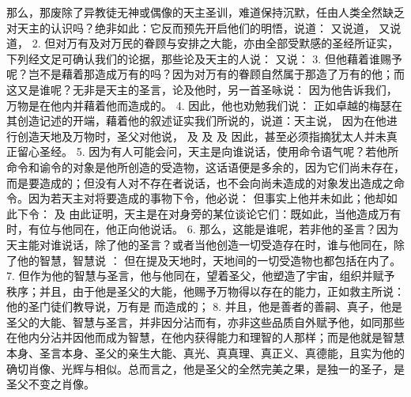 那么，那废除了异教徒无神或偶像的天主圣训，难道保持沉默，任由人类全然缺乏对天主的认识吗？绝非如此：它反而预先开启他们的明悟，说道： 又说道， 又说道， 2. 但对万有及对万民的眷顾与安排之大能，亦由全部受默感的圣经所证实，下列经文足可确认我们的论据，那些论及天主的人说： 又说： 3. 但他藉着谁赐予呢？岂不是藉着那造成万有的吗？因为对万有的眷顾自然属于那造了万有的他；而这又是谁呢？无非是天主的圣言，论及他时，另一首圣咏说： 因为他告诉我们，万物是在他内并藉着他而造成的。 4. 因此，他也劝勉我们说： 正如卓越的梅瑟在其创造记述的开端，藉着他的叙述证实我们所说的，说道：天主说， 因为在他进行创造天地及万物时，圣父对他说， 及  及  及  因此，甚至必须指摘犹太人并未真正留心圣经。 5. 因为有人可能会问，天主是向谁说话，使用命令语气呢？若他所命令和谕令的对象是他所创造的受造物，这话语便是多余的，因为它们尚未存在，而是要造成的；但没有人对不存在者说话，也不会向尚未造成的对象发出造成之命令。因为若天主对将要造成的事物下令，他必说： 但事实上他并未如此；他却如此下令： 及  由此证明，天主是在对身旁的某位谈论它们：既如此，当他造成万有时，有位与他同在，他正向他说话。 6. 那么，这能是谁呢，若非他的圣言？因为天主能对谁说话，除了他的圣言？或者当他创造一切受造存在时，谁与他同在，除了他的智慧，智慧说 ： 但在提及天地时，天地间的一切受造物也都包括在内了。 7. 但作为他的智慧与圣言，他与他同在，望着圣父，他塑造了宇宙，组织并赋予秩序；并且，由于他是圣父的大能，他赐予万物得以存在的能力，正如救主所说： 他的圣门徒们教导说，万有是  而造成的； 8. 并且，他是善者的善嗣、真子，他是圣父的大能、智慧与圣言，并非因分沾而有，亦非这些品质自外赋予他，如同那些在他内分沾并因他而成为智慧，在他内获得能力和理智的人那样；而是他就是智慧本身、圣言本身、圣父的亲生大能、真光、真真理、真正义、真德能，且实为他的确切肖像、光辉与相似。总而言之，他是圣父的全然完美之果，是独一的圣子，是圣父不变之肖像。\par

